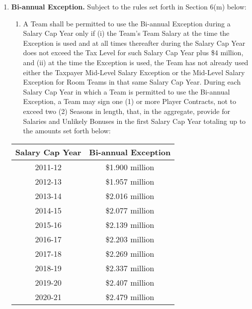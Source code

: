 \documentclass[
]{book}
\providecommand{\tightlist}{%
  \setlength{\itemsep}{0pt}\setlength{\parskip}{0pt}}
\begin{document}
\begin{enumerate}
\begin{enumerate}
  \end{enumerate}
\item
  \textbf{Bi-annual Exception.} Subject to the rules set forth in Section 6(m) below:

  \begin{enumerate}
  \def\labelenumii{(\arabic{enumii})}
  \tightlist
  \item
    A Team shall be permitted to use the Bi-annual Exception during a Salary Cap Year only if (i) the Team's Team Salary at the time the Exception is used and at all times thereafter during the Salary Cap Year does not exceed the Tax Level for such Salary Cap Year plus \$4 million, and (ii) at the time the Exception is used, the Team has not already used either the Taxpayer Mid-Level Salary Exception or the Mid-Level Salary Exception for Room Teams in that same Salary Cap Year. During each Salary Cap Year in which a Team is permitted to use the Bi-annual Exception, a Team may sign one (1) or more Player Contracts, not to exceed two (2) Seasons in length, that, in the aggregate, provide for Salaries and Unlikely Bonuses in the first Salary Cap Year totaling up to the amounts set forth below:
  \end{enumerate}

  \begin{longtable}[]{@{}cc@{}}
  \toprule()
  Salary Cap Year & Bi-annual Exception \\
  \midrule()
  \endhead
  2011-12 & \$1.900 million \\
  2012-13 & \$1.957 million \\
  2013-14 & \$2.016 million \\
  2014-15 & \$2.077 million \\
  2015-16 & \$2.139 million \\
  2016-17 & \$2.203 million \\
  2017-18 & \$2.269 million \\
  2018-19 & \$2.337 million \\
  2019-20 & \$2.407 million \\
  2020-21 & \$2.479 million \\
  \bottomrule()
  \end{longtable}


\end{enumerate}
\end{document}
